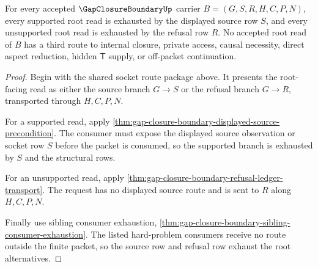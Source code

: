 \begin{theorem}
\label{thm:gap-closure-boundary-source-refusal-exhaustion}
For every accepted $\GapClosureBoundaryUp$ carrier $B=(G,S,R,H,C,P,N)$, every supported root read is exhausted by the displayed source row $S$, and every unsupported root read is exhausted by the refusal row $R$. No accepted root read of $B$ has a third route to internal closure, private access, causal necessity, direct aspect reduction, hidden $\mathsf{T}$ supply, or off-packet continuation.
\end{theorem}
\begin{proof}
Begin with the shared socket route package above. It presents the root-facing read as either the source branch $G \longrightarrow S$ or the refusal branch $G \longrightarrow R$, transported through $H,C,P,N$.

For a supported read, apply \autoref{thm:gap-closure-boundary-displayed-source-precondition}. The consumer must expose the displayed source observation or socket row $S$ before the packet is consumed, so the supported branch is exhausted by $S$ and the structural rows.

For an unsupported read, apply \autoref{thm:gap-closure-boundary-refusal-ledger-transport}. The request has no displayed source route and is sent to $R$ along $H,C,P,N$.

Finally use sibling consumer exhaustion, \autoref{thm:gap-closure-boundary-sibling-consumer-exhaustion}. The listed hard-problem consumers receive no route outside the finite packet, so the source row and refusal row exhaust the root alternatives.
\end{proof}

